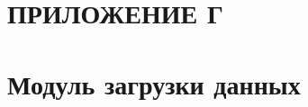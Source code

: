 \section*{ПРИЛОЖЕНИЕ Г}
\section*{Модуль загрузки данных}
\setcounter{lstlisting}{0}
\renewcommand{\thelstlisting}{Г.\arabic{lstlisting}} %



